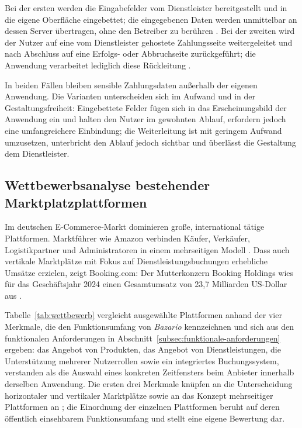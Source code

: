 Bei der ersten werden die Eingabefelder vom Dienstleister
bereitgestellt und in die eigene Oberfläche eingebettet; die
eingegebenen Daten werden unmittelbar an dessen Server übertragen,
ohne den Betreiber zu berühren \cite{stripe_elements_docs}. Bei der
zweiten wird der Nutzer auf eine vom Dienstleister gehostete
Zahlungsseite weitergeleitet und nach Abschluss auf eine Erfolgs- oder
Abbruchseite zurückgeführt; die Anwendung verarbeitet lediglich diese
Rückleitung \cite{stripe_checkout_docs}.

In beiden Fällen bleiben sensible Zahlungsdaten außerhalb der eigenen
Anwendung. Die Varianten unterscheiden sich im Aufwand und in der
Gestaltungsfreiheit: Eingebettete Felder fügen sich in das
Erscheinungsbild der Anwendung ein und halten den Nutzer im gewohnten
Ablauf, erfordern jedoch eine umfangreichere Einbindung; die
Weiterleitung ist mit geringem Aufwand umzusetzen, unterbricht den
Ablauf jedoch sichtbar und überlässt die Gestaltung dem Dienstleister.


\subsection{Wettbewerbsanalyse bestehender Marktplatzplattformen}
\label{subsec:wettbewerbsanalyse}

Im deutschen E-Commerce-Markt dominieren große, international tätige
Plattformen. Marktführer wie Amazon verbinden Käufer, Verkäufer,
Logistikpartner und Administratoren in einem mehrseitigen Modell
\cite{hein_platform_ecosystems}. Dass auch vertikale Marktplätze
mit Fokus auf Dienstleistungsbuchungen erhebliche Umsätze erzielen,
zeigt Booking.com: Der Mutterkonzern Booking Holdings wies für das
Geschäftsjahr 2024 einen Gesamtumsatz von 23,7 Milliarden
US-Dollar aus \cite{booking_holdings_q4_2024}.

Tabelle~\ref{tab:wettbewerb} vergleicht ausgewählte Plattformen
anhand der vier Merkmale, die den Funktionsumfang von
\textit{Bazario} kennzeichnen und sich aus den funktionalen
Anforderungen in Abschnitt~\ref{subsec:funktionale-anforderungen}
ergeben: das Angebot von Produkten, das Angebot von
Dienstleistungen, die Unterstützung mehrerer Nutzerrollen sowie ein
integriertes Buchungssystem, verstanden als die Auswahl eines
konkreten Zeitfensters beim Anbieter innerhalb derselben Anwendung.
Die ersten drei Merkmale knüpfen an die Unterscheidung horizontaler
und vertikaler Marktplätze sowie an das Konzept mehrseitiger
Plattformen an
\cite{taeuscher_platform_models,
hein_platform_ecosystems}; die Einordnung der einzelnen Plattformen
beruht auf deren öffentlich einsehbarem Funktionsumfang und stellt
eine eigene Bewertung dar.

